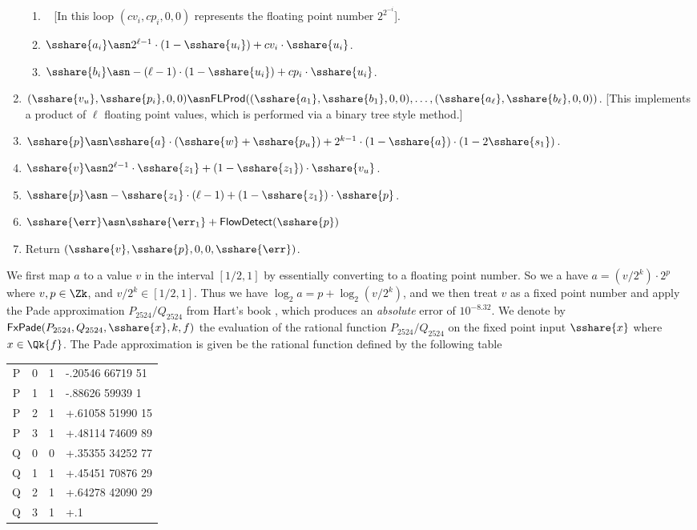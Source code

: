 \begin{enumerate}
\begin{enumerate}
  \item~ [In this loop $(cv_i,cp_i,0,0)$ represents the floating point number $2^{2^{-i}}$].
  \item $\sshare{a_i} \asn 2^{\ell-1} \cdot (1-\sshare{u_i})+cv_i \cdot \sshare{u_i}$.
  \item $\sshare{b_i} \asn -(\ell-1) \cdot (1-\sshare{u_i})+cp_i \cdot \sshare{u_i}$.
\end{enumerate}
\item $(\sshare{v_u},\sshare{p_i},0,0)
	\asn \mathsf{FLProd}((\sshare{a_1},\sshare{b_1},0,0), \ldots,
	                     (\sshare{a_\ell},\sshare{b_\ell},0,0))$. 
			     [This implements a product of $\ell$ floating point values, which is
			      performed via a binary tree style method.]
\item $\sshare{p} \asn \sshare{a} \cdot (\sshare{w}+\sshare{p_u})
			+2^{k-1}\cdot (1-\sshare{a}) \cdot (1-2 \sshare{s_1})$.
\item $\sshare{v} \asn 2^{\ell-1} \cdot \sshare{z_1}+(1-\sshare{z_1}) \cdot \sshare{v_u}$.
\item $\sshare{p} \asn -\sshare{z_1} \cdot (\ell-1)
			+(1-\sshare{z_1}) \cdot \sshare{p}$.
\item $\sshare{\err} \asn \sshare{\err_1} +  \mathsf{FlowDetect}(\sshare{p})$
\item Return $(\sshare{v},\sshare{p},0,0,\sshare{\err})$.
\end{enumerate}

We first map $a$ to a value $v$ in the interval $[1/2,1]$ by essentially
converting to a floating point number.
So we a have $a=(v/2^k) \cdot 2^p$ where $v, p \in \Zk$,
and $v/2^k \in [1/2,1]$.
Thus we have 
$\log_2 a = p+\log_2 (v/2^k)$, and we then treat $v$ as a fixed
point number and apply the Pade approximation $P_{2524}/Q_{2524}$
from Hart's book \cite{Hart:1978:CA:540084},
which produces an {\em absolute} error of $10^{-8.32}$.
We denote by $\mathsf{FxPade}(P_{2524},Q_{2524},\sshare{x},k,f)$ the evaluation
of the rational function $P_{2524}/Q_{2524}$ on the fixed point input $\sshare{x}$
where $x \in \Qk{f}$.
The Pade approximation is given be the rational function defined
by the following table
\begin{center}
\begin{tabular}{|c|c|c|l|}
\hline
P & 0 & 1  & -.20546 66719 51 \\
P & 1 & 1  & -.88626 59939 1 \\
P & 2 & 1  & +.61058 51990 15 \\
P & 3 & 1  & +.48114 74609 89 \\ 
Q & 0 & 0  & +.35355 34252 77 \\ 
Q & 1 & 1  & +.45451 70876 29  \\
Q & 2 & 1  & +.64278 42090 29 \\ 
Q & 3 & 1  & +.1 \\ 
\hline
\end{tabular}
\end{center}

